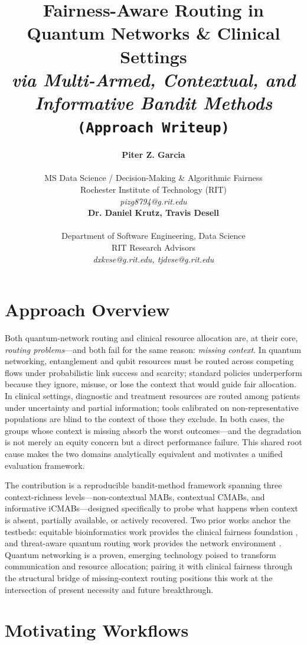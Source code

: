 \documentclass{IEEEtran}
\title{{\LARGE\textbf{Fairness-Aware Routing in Quantum Networks \& Clinical Settings}}\\
{\Large\textit{via Multi-Armed, Contextual, and Informative Bandit Methods}}\\
{\large\texttt{(Approach Writeup)}}}
\author{%
\begin{minipage}{0.48\textwidth}
\begin{center}
{\bf Piter Z. Garcia}\\
\begin{small}
MS Data Science / Decision-Making \& Algorithmic Fairness\\
Rochester Institute of Technology (RIT)\\
{\it pizg8794@g.rit.edu}
\end{small}
\end{center}
\end{minipage}
\hfill
\begin{minipage}{0.48\textwidth}
\begin{center}
{\bf Dr. Daniel Krutz, Travis Desell}\\
\begin{small}
Department of Software Engineering, Data Science\\
RIT Research Advisors\\
{\it dxkvse@g.rit.edu, tjdvse@g.rit.edu}
\end{small}
\end{center}
\end{minipage}%
}
\begin{document}
\maketitle

\section{Approach Overview}

Both quantum-network routing and clinical resource allocation are, at their
core, \textit{routing problems}---and both fail for the same reason:
\textit{missing context}. In quantum networking, entanglement and qubit
resources must be routed across competing flows under probabilistic link
success and scarcity; standard policies underperform because they ignore,
misuse, or lose the context that would guide fair allocation. In clinical
settings, diagnostic and treatment resources are routed among patients under
uncertainty and partial information; tools calibrated on non-representative
populations are blind to the context of those they exclude. In both cases,
the groups whose context is missing absorb the worst outcomes---and the
degradation is not merely an equity concern but a direct performance failure.
This shared root cause makes the two domains analytically equivalent and
motivates a unified evaluation framework.

The contribution is a reproducible bandit-method framework spanning three
context-richness levels---non-contextual MABs, contextual CMABs, and
informative iCMABs---designed specifically to probe what happens when context
is absent, partially available, or actively recovered. Two prior works anchor
the testbeds: equitable bioinformatics work provides the clinical fairness
foundation \cite{garcia2025equitable_bioinformatics}, and threat-aware
quantum routing work provides the network environment
\cite{garcia2026threat_aware_quantum_routing}. Quantum networking is a
proven, emerging technology poised to transform communication and resource
allocation; pairing it with clinical fairness through the structural bridge
of missing-context routing positions this work at the intersection of present
necessity and future breakthrough.

\section{Motivating Workflows}
\end{document}
